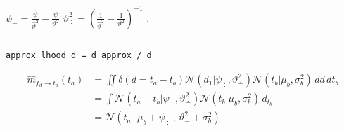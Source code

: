 \documentclass[article]{jss}
\newif\ifen
\newif\ifes
\newcommand{\en}[1]{\ifen#1\fi}
\newcommand{\es}[1]{\ifes#1\fi}
\newcommand{\N}{\mathcal{N}}
\begin{document}
%
\en{with} $\psi_{\div} = \frac{\widehat{\psi}}{\widehat{\vartheta}^2} - \frac{\psi}{\vartheta^2}$ \en{and} $\vartheta_{\div}^2 = (\frac{1}{\widehat{\vartheta}^2} - \frac{1}{\vartheta^2})^{-1}$ .
%
\en{We have access to this message when we use the \texttt{/} operator of the \texttt{Gaussian} class to divide the indicated Gaussians,}
\es{Tenemos acceso a este mensaje cuando usamos el operador \texttt{/} de la clase \texttt{Gaussian}, para dividir las gaussianas indicadas,}
%
\begin{lstlisting}[backgroundcolor=\color{white}, label=lst:d_div, caption={\en{Computing the first approximate message}\es{Computando el primer mensaje aproximado}}, belowskip=-1.0 \baselineskip, aboveskip=-0 \baselineskip]
\end{lstlisting}
\begin{lstlisting}[backgroundcolor=\color{all},belowskip=0.0 \baselineskip]
approx_lhood_d = d_approx / d
\end{lstlisting}  
%
\en{All these messages can be interpreted as approximate likelihoods via Guassian distributions.}
\es{Todos estos mensajes pueden ser interpretados como verosimilitudes aproximadas mediante distribuciones guassianas.}
%
\en{The approximate message sent by difference factor $f_d$ to the winning team performance variables $t_a$ is,}
\es{El mensaje aproximado que el factor diferencia $f_d$ envía a la variables de desempeño del equipo ganador $t_a$ es,}
%
\begin{equation}%
\begin{split}
\widehat{m}_{f_{d} \rightarrow t_a}(t_a) & =  \iint \delta(d = t_a - t_b) \N(d_1 | \psi_{\div}, \vartheta_{\div}^2) \N(t_b | \mu_b , \sigma_b^2 )  \, d{d} \,dt_b \\
& = \int  \N( t_a-t_b | \psi_{\div}, \vartheta_{\div}^2) \N(t_b | \mu_b , \sigma_b^2 )  \,  d_{t_b} \\
& = \N(t_a \, | \, \mu_b + \psi_{\div} \, , \, \vartheta_{\div}^2 + \sigma_b^2) \\
\end{split}
\end{equation}
\end{document}

